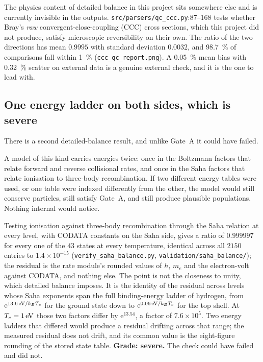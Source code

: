 The physics content of detailed balance in this project sits somewhere else and
is currently invisible in the outputs. \texttt{src/parsers/qc\_ccc.py}:87--168
tests whether Bray's \emph{raw} convergent-close-coupling (CCC) cross sections,
which this project did not produce, satisfy microscopic reversibility on their
own. The ratio of the two directions has mean $0.9995$ with standard deviation
$0.0032$, and \SI{98.7}{\percent} of comparisons fall within \SI{1}{\percent}
(\texttt{ccc\_qc\_report.png}). A \SI{0.05}{\percent} mean bias with
\SI{0.32}{\percent} scatter on external data is a genuine external check, and it
is the one to lead with.

\subsection{One energy ladder on both sides, which is severe}

There is a second detailed-balance result, and unlike Gate~A it could have
failed.

A model of this kind carries energies twice: once in the Boltzmann factors that
relate forward and reverse collisional rates, and once in the Saha factors that
relate ionisation to three-body recombination. If two different energy tables
were used, or one table were indexed differently from the other, the model would
still conserve particles, still satisfy Gate~A, and still produce plausible
populations. Nothing internal would notice.

Testing ionisation against three-body recombination through the Saha relation
at every level, with CODATA constants on the Saha side, gives a ratio of
$0.999997$ for every one of the $43$ states at every temperature, identical
across all $2150$ entries to $1.4\times10^{-15}$
(\texttt{verify\_saha\_balance.py}, \texttt{validation/saha\_balance/}); the
residual is the rate module's rounded values of $h$, $m_e$ and the
electron-volt against CODATA, and nothing else. The point is not the
closeness to unity, which detailed balance imposes. It is the identity of the residual across
levels whose Saha exponents span the full binding-energy ladder of hydrogen,
from $\mathrm{e}^{13.6\,\mathrm{eV}/k_BT_e}$ for the ground state down to
$\mathrm{e}^{0.06\,\mathrm{eV}/k_BT_e}$ for the top shell. At
$T_e = \SI{1}{\electronvolt}$ those two factors differ by
$\mathrm{e}^{13.54}$, a factor of $7.6\times10^{5}$. Two energy ladders that
differed would produce a residual drifting across that range; the measured
residual does not drift, and its common value is the eight-figure rounding of
the stored state table. \textbf{Grade: severe.} The check could have failed and
did not.

